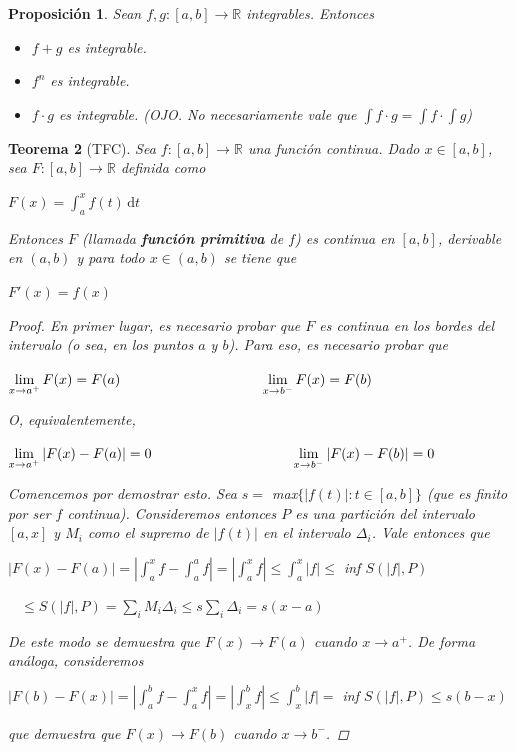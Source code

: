 \documentclass[]{article}
\newtheorem{teo}{Teorema}
\newtheorem{prop}[teo]{Proposición}
\def\R{\mathbb{R}}
\newcommand{\integral}[4]{\int_{#1}^{#2} \! #3 \, \mathrm{d}#4}
\newcommand{\intres}[3]{\int_{#1}^{#2} \! #3}
\begin{document}
\begin{prop}
	Sean $f,g:[a,b]\to\R$ integrables. Entonces 
	\begin{itemize}
		\item $f+g$ es integrable.
		\item $f^n$ es integrable.
		\item $f\cdot g$ es integrable. (OJO. No necesariamente vale que $\int \! f\cdot g = \int \! f \cdot \int \! g$)
	\end{itemize}
\end{prop}

\begin{teo}[TFC]
	Sea $f:[a,b]\to\R$ una función continua. Dado $x\in[a,b]$, sea $F:[a,b]\to\R$ definida como
	\begin{center}
		$\displaystyle F(x) = \integral{a}{x}{f(t)}{t}$
	\end{center}
	Entonces $F$ (llamada \textbf{función primitiva} de $f$) es continua en $[a,b]$, derivable en $(a,b)$ y para todo $x\in(a,b)$ se tiene que 
	\begin{center}
		$\displaystyle F'(x) = f(x)$
	\end{center}
	\begin{proof}
		En primer lugar, es necesario probar que $F$ es continua en los bordes del intervalo (o sea, en los puntos $a$ y $b$). Para eso, es necesario probar que 
		\begin{center}
			$\displaystyle \lim_{x\to a^+}F(x)=F(a) \hspace*{100pt} \lim_{x\to b^-}F(x)=F(b)$
		\end{center}
		O, equivalentemente, 
		\begin{center}
			$\displaystyle \lim_{x\to a^+}|F(x)-F(a)|=0 \hspace*{100pt} \lim_{x\to b^-}|F(x)-F(b)|=0$
		\end{center}
		
		Comencemos por demostrar esto. Sea $s = $ max$ \{|f(t)|:t\in[a,b]\}$ (que es finito por ser $f$ continua). Consideremos entonces $P$ es una partición del intervalo $[a,x]$ y $M_i$ como el supremo de $|f(t)|$ en el intervalo $\Delta_i$. Vale entonces que
		\begin{center}
			$\displaystyle |F(x)-F(a)| = |\intres{a}{x}{f}-\intres{a}{a}{f}| = |\intres{a}{x}{f}| \leq \intres{a}{x}{|f|} \leq$ inf $S(|f|,P)$

			~\newline
			$\displaystyle \leq S(|f|,P) = \sum_{i}M_i \Delta_i \leq s\sum_i \Delta_i = s(x-a)$
		\end{center}
		De este modo se demuestra que $F(x) \to F(a)$ cuando $x\to a^+$. De forma análoga, consideremos
		\begin{center}
			$\displaystyle |F(b)-F(x)| = |\intres{a}{b}{f}-\intres{a}{x}{f}| = |\intres{x}{b}{f}| \leq \intres{x}{b}{|f|} = $ inf $S(|f|,P) \leq s(b-x)$
		\end{center}
		que demuestra que $F(x)\to F(b)$ cuando $x\to b^-$.
		

\end{proof}
\end{teo}
\end{document}
